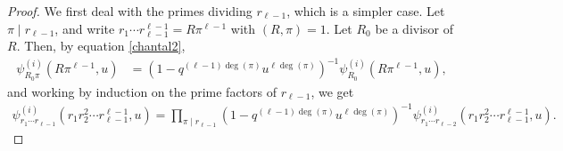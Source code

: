 \documentclass[12pt]{amsart}
\begin{document}
\begin{proof}

We first deal with the primes dividing $r_{\ell-1}$, which is a simpler case.
Let $\pi \mid r_{\ell-1}$, and write $r_1 \cdots r_{\ell-1}^{\ell-1} =  R \pi^{\ell-1}$ with $(R, \pi)=1$. Let $R_0$ be a divisor of $R$.
Then, by equation \eqref{chantal2},
\begin{align*}
\psi_{R_0\pi}^{(i)}(R \pi^{\ell-1},u)
&= \left( 1 - q^{(\ell-1)\deg(\pi) } u^{\ell\deg(\pi)} \right)^{-1} \psi_{R_0}^{(i)}(R \pi^{\ell-1},u),
\end{align*}
and working by induction on the prime factors of $r_{\ell-1}$, we get
\begin{align*}
\psi_{r_1 \cdots r_{\ell-1}}^{(i)}(r_1 r_2^2 \cdots r_{\ell-1}^{\ell-1},u)
= \prod_{\pi \mid r_{\ell-1}} \left( 1 - q^{(\ell-1)\deg(\pi) } u^{\ell\deg(\pi)} \right)^{-1} \psi^{(i)}_{r_1 \cdots r_{\ell-2}}(r_1 r_2^2 \cdots r_{\ell-1}^{\ell-1},u).
\end{align*}




\end{proof}
\end{document}
